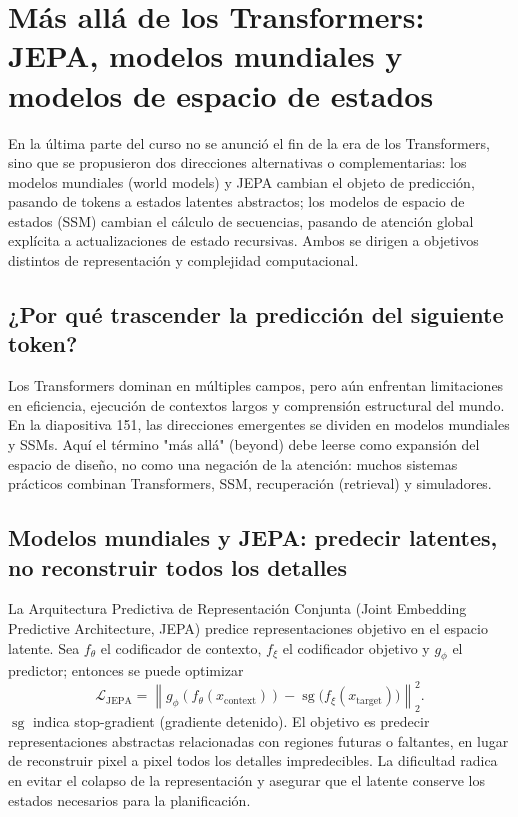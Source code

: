 \section{Más allá de los Transformers: JEPA, modelos mundiales y modelos de espacio de estados}

En la última parte del curso no se anunció el fin de la era de los Transformers, sino que se propusieron dos direcciones alternativas o complementarias: los modelos mundiales (world models) y JEPA cambian el objeto de predicción, pasando de tokens a estados latentes abstractos; los modelos de espacio de estados (SSM) cambian el cálculo de secuencias, pasando de atención global explícita a actualizaciones de estado recursivas. Ambos se dirigen a objetivos distintos de representación y complejidad computacional.

\subsection{¿Por qué trascender la predicción del siguiente token?}

Los Transformers dominan en múltiples campos, pero aún enfrentan limitaciones en eficiencia, ejecución de contextos largos y comprensión estructural del mundo. En la diapositiva 151, las direcciones emergentes se dividen en modelos mundiales y SSMs. Aquí el término "más allá" (beyond) debe leerse como expansión del espacio de diseño, no como una negación de la atención: muchos sistemas prácticos combinan Transformers, SSM, recuperación (retrieval) y simuladores.



\subsection{Modelos mundiales y JEPA: predecir latentes, no reconstruir todos los detalles}

La Arquitectura Predictiva de Representación Conjunta (Joint Embedding Predictive Architecture, JEPA) predice representaciones objetivo en el espacio latente. Sea $f_{\theta}$ el codificador de contexto, $f_{\xi}$ el codificador objetivo y $g_{\phi}$ el predictor; entonces se puede optimizar
\[
\mathcal{L}_{\mathrm{JEPA}}
=\left\|g_{\phi}(f_{\theta}(x_{\mathrm{context}}))-\operatorname{sg}\big(f_{\xi}(x_{\mathrm{target}})\big)\right\|_2^2.
\]
$\operatorname{sg}$ indica stop-gradient (gradiente detenido). El objetivo es predecir representaciones abstractas relacionadas con regiones futuras o faltantes, en lugar de reconstruir pixel a pixel todos los detalles impredecibles. La dificultad radica en evitar el colapso de la representación y asegurar que el latente conserve los estados necesarios para la planificación.


